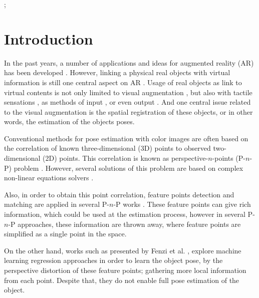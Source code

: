 \documentclass[annual]{acmsiggraph}
\begin{document}
\begin{CRcatlist}
  ;
\end{CRcatlist}

\keywordlist

\TOGlinkslist

\copyrightspace

\section{Introduction}
\label{sec:intro}


In the past years, a number of applications and ideas for augmented reality (AR) has been developed \cite{Benko:2014,Krevelen:2010}. However, linking a physical real objects with virtual information is still one central aspect on AR \cite{Krevelen:2010}. Usage of real objects as link to virtual contents is not only limited to visual augmentation \cite{Comport:2006}, but also with tactile sensations \cite{Bau:2012}, as methods of input \cite{Heun:2013}, or even output  \cite{Leithinger:2014}. And one central issue related to the visual augmentation is the spatial registration of these objects, or in other words, the estimation of the objects poses. 

Conventional methods for pose estimation with color images are often based on the correlation of known three-dimensional (3D) points to observed two-dimensional (2D) points. This correlation is known as perspective-$n$-points (P-$n$-P) problem \cite{Fischler:1981}. However, several solutions of this problem are based on complex non-linear equations solvers \cite{Lepetit:2009}. 

Also, in order to obtain this point correlation, feature points detection and matching \cite{Lowe:1999,Bay:2008} are applied in several P-$n$-P works \cite{Lowe:1999}. These feature points can give rich information, which could be used at the estimation process, however in several P-$n$-P approaches, these information are thrown away, where feature points are simplified as a single point in the space. 

On the other hand, works such as presented by Fenzi et al. \cite{Fenzi:2013}, explore machine learning regression approaches in order to learn the object pose, by the perspective distortion of these feature points; gathering more local information from each point. Despite that, they do not enable full pose estimation of the object.  
\end{document}
